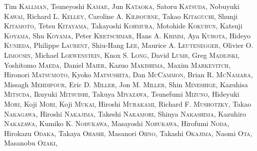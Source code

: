 {Tim \textsc{Kallman},
Tsuneyoshi \textsc{Kamae},
Jun \textsc{Kataoka},
Satoru \textsc{Katsuda},
Nobuyuki \textsc{Kawai},
Richard L. \textsc{Kelley},
Caroline A. \textsc{Kilbourne},
Takao \textsc{Kitaguchi},
Shunji \textsc{Kitamoto},
Tetsu \textsc{Kitayama},
Takayoshi \textsc{Kohmura},
Motohide \textsc{Kokubun},
Katsuji \textsc{Koyama},
Shu \textsc{Koyama},
Peter \textsc{Kretschmar},
Hans A. \textsc{Krimm},
Aya \textsc{Kubota},
Hideyo \textsc{Kunieda},
Philippe \textsc{Laurent},
Shiu-Hang \textsc{Lee},
Maurice A. \textsc{Leutenegger},
Olivier O. \textsc{Limousin},
Michael \textsc{Loewenstein},
Knox S. \textsc{Long},
David \textsc{Lumb},
Greg \textsc{Madejski},
Yoshitomo \textsc{Maeda},
Daniel \textsc{Maier},
Kazuo \textsc{Makishima},
Maxim \textsc{Markevitch},
Hironori \textsc{Matsumoto},
Kyoko \textsc{Matsushita},
Dan \textsc{McCammon},
Brian R. \textsc{McNamara},
Missagh \textsc{Mehdipour},
Eric D. \textsc{Miller},
Jon M. \textsc{Miller},
Shin \textsc{Mineshige},
Kazuhisa \textsc{Mitsuda},
Ikuyuki \textsc{Mitsuishi},
Takuya \textsc{Miyazawa},
Tsunefumi \textsc{Mizuno},
Hideyuki \textsc{Mori},
Koji \textsc{Mori},
Koji \textsc{Mukai},
Hiroshi \textsc{Murakami},
Richard F. \textsc{Mushotzky},
Takao \textsc{Nakagawa},
Hiroshi \textsc{Nakajima},
Takeshi \textsc{Nakamori},
Shinya \textsc{Nakashima},
Kazuhiro \textsc{Nakazawa},
Kumiko K. \textsc{Nobukawa},
Masayoshi \textsc{Nobukawa},
Hirofumi \textsc{Noda},
Hirokazu \textsc{Odaka},
Takaya \textsc{Ohashi},
Masanori \textsc{Ohno},
Takashi \textsc{Okajima},
Naomi \textsc{Ota},
Masanobu \textsc{Ozaki},
}
